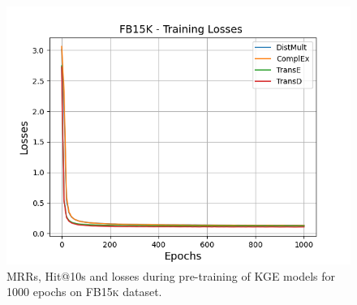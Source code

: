 \begin{figure}
\begin{minipage}{.3\textwidth}
      \includegraphics[width=\linewidth]{figures/results/pretrain/fb15k/pretrain_fb15k_losses.png}
    \end{minipage}%
    \caption{MRRs, Hit@10s and losses during pre-training of \ac{KGE} models for 1000 epochs on \textsc{FB15k} dataset.}
    \label{fig:pretraining}
\end{figure}


